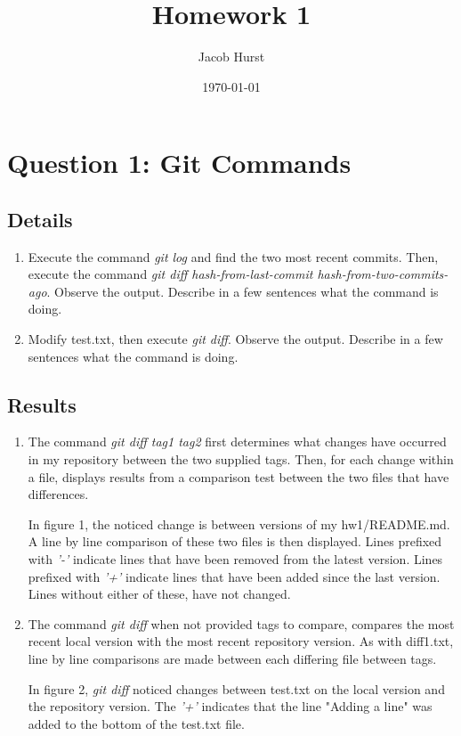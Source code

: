 \documentclass[12pt]{article}
\title{Homework 1}
\author{Jacob Hurst}
\date{\today}
\begin{document}
\maketitle
\clearpage

\section{Question 1: Git Commands}

\subsection{Details}
\begin{enumerate}

\item Execute the command \emph{git log} and find the two most recent commits. Then, execute the command \emph{git diff hash-from-last-commit hash-from-two-commits-ago}. Observe the output. Describe in a few sentences what the command is doing.
\item Modify test.txt, then execute \emph{git diff}. Observe the output. Describe in a few sentences what the command is doing.

\end{enumerate}

\subsection{Results}

\begin{enumerate}

\item The command \emph{git diff tag1 tag2} first determines what changes have occurred in my repository between the two supplied tags. Then, for each change within a file, displays results from a comparison test between the two files that have differences. 

In figure 1, the noticed change is between versions of my hw1/README.md. A line by line comparison of these two files is then displayed. Lines prefixed with \emph{'-'} indicate lines that have been removed from the latest version. Lines prefixed with \emph{'+'} indicate lines that have been added since the last version. Lines without either of these, have not changed.

\item The command \emph{git diff} when not provided tags to compare, compares the most recent local version with the most recent repository version. As with diff1.txt, line by line comparisons are made between each differing file between tags. 

In figure 2, \emph{git diff} noticed changes between test.txt on the local version and the repository version. The \emph{'+'} indicates that the line "Adding a line" was added to the bottom of the test.txt file.

\end{enumerate}
\end{document}
